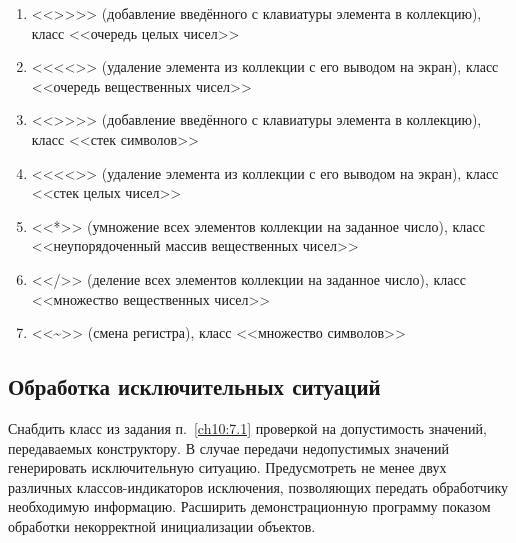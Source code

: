 \begin{enumerate}
\item <<{>}{>}>>  (добавление введённого с клавиатуры элемента в коллекцию), класс <<очередь целых
чисел>>
\item <<{<}{<}>> (удаление элемента из коллекции с его выводом на экран), класс <<очередь вещественных
чисел>>
\item <<{>}{>}>>  (добавление введённого с клавиатуры элемента в коллекцию), класс <<стек символов>>
\item <<{<}{<}>> (удаление элемента из коллекции с его выводом на экран), класс <<стек целых чисел>>
\item <<*>> (умножение всех элементов коллекции на заданное число), класс <<неупорядоченный массив вещественных чисел>>
\item <</>> (деление всех элементов коллекции на заданное число), класс <<множество вещественных чисел>>
\item <<\~{}>> (смена регистра), класс <<множество символов>>
\end{enumerate}
\subsection[Обработка исключительных ситуаций]{Обработка исключительных ситуаций}
Снабдить класс из задания п.~\ref{ch10:7.1} проверкой на допустимость значений, 
передаваемых конструктору. В случае передачи
недопустимых значений генерировать исключительную ситуацию. Предусмотреть не менее двух различных классов-индикаторов
исключения, позволяющих передать обработчику необходимую информацию. 
Расширить демонстрационную программу показом
обработки некорректной инициализации объектов. 

\renewcommand{\arraystretch}{1.0}
